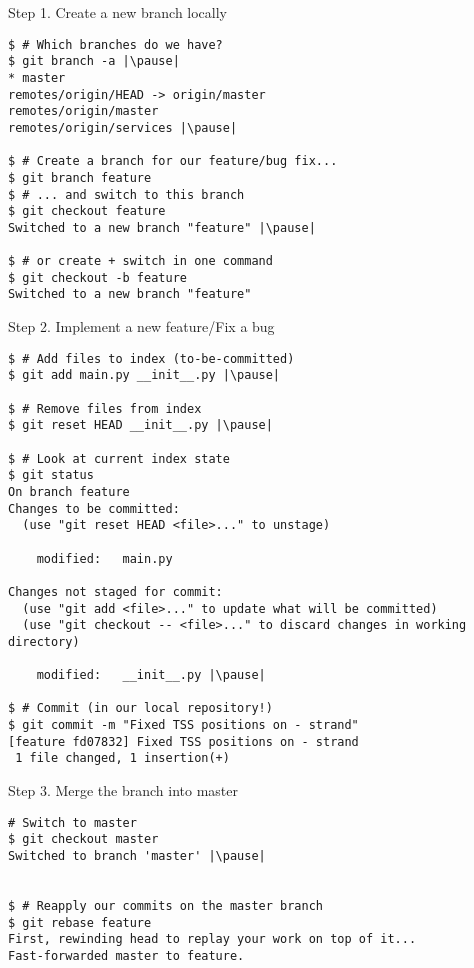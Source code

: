 \begin{frame}[fragile]{Step 1. Create a new branch locally}
	\begin{lstlisting}
$ # Which branches do we have?
$ git branch -a |\pause|
* master
remotes/origin/HEAD -> origin/master
remotes/origin/master
remotes/origin/services |\pause|

$ # Create a branch for our feature/bug fix...
$ git branch feature
$ # ... and switch to this branch
$ git checkout feature 
Switched to a new branch "feature" |\pause|

$ # or create + switch in one command
$ git checkout -b feature 
Switched to a new branch "feature"
  	\end{lstlisting}
\end{frame}

\begin{frame}[fragile]{Step 2. Implement a new feature/Fix a bug}
  	\begin{lstlisting}
$ # Add files to index (to-be-committed)
$ git add main.py __init__.py |\pause|

$ # Remove files from index
$ git reset HEAD __init__.py |\pause|

$ # Look at current index state
$ git status
On branch feature
Changes to be committed:
  (use "git reset HEAD <file>..." to unstage)

	modified:   main.py

Changes not staged for commit:
  (use "git add <file>..." to update what will be committed)
  (use "git checkout -- <file>..." to discard changes in working directory)

	modified:   __init__.py |\pause|

$ # Commit (in our local repository!)
$ git commit -m "Fixed TSS positions on - strand"
[feature fd07832] Fixed TSS positions on - strand
 1 file changed, 1 insertion(+)
  	\end{lstlisting}
\end{frame}


\begin{frame}[fragile]{Step 3. Merge the branch into master}
  	\begin{lstlisting}
# Switch to master
$ git checkout master
Switched to branch 'master' |\pause|


$ # Reapply our commits on the master branch
$ git rebase feature
First, rewinding head to replay your work on top of it...
Fast-forwarded master to feature.
	\end{lstlisting}
\end{frame}

